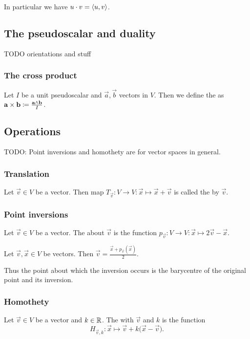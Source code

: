 In particular we have $u\cdot v = \inner{u,v}$.

\subsection{The pseudoscalar and duality}
TODO orientations and stuff

\subsubsection{The cross product}
\begin{definition}
Let $I$ be a unit pseudoscalar and $\vec{a},\vec{b}$ vectors in $V$. Then we define the  as $\boldsymbol{\mathrm{a}}\times\boldsymbol{\mathrm{b}} \coloneqq \frac{\boldsymbol{\mathrm{a}}\wedge \boldsymbol{\mathrm{b}}}{I}$.
\end{definition}

\subsection{Operations}
TODO: Point inversions and homothety are for vector spaces in general.

\subsubsection{Translation}
\begin{definition}
Let $\vec{v}\in V$ be a vector. Then map $T_{\vec{v}}: V\to V: \vec{x}\mapsto \vec{x}+ \vec{v}$ is called the  by $\vec{v}$.
\end{definition}

\subsubsection{Point inversions}
\begin{definition}
Let $\vec{v}\in V$ be a vector. The  about $\vec{v}$ is the function $p_{\vec{v}}: V\to V: \vec{x}\mapsto 2 \vec{v} - \vec{x}$.
\end{definition}

\begin{lemma}
Let $\vec{v}, \vec{x}\in V$ be vectors. Then $\vec{v} = \frac{\vec{x}+ p_{\vec{v}}(\vec{x})}{2}$.
\end{lemma}
Thus the point about which the inversion occurs is the barycentre of the original point and its inversion.

\subsubsection{Homothety}
\begin{definition}
Let $\vec{v}\in V$ be a vector and $k\in \mathbb{R}$. The  with  $\vec{v}$ and  $k$ is the function
\[ H_{\vec{v}, k}: \vec{x} \mapsto \vec{v} + k \big(\vec{x} - \vec{v}\big). \]
\end{definition}

